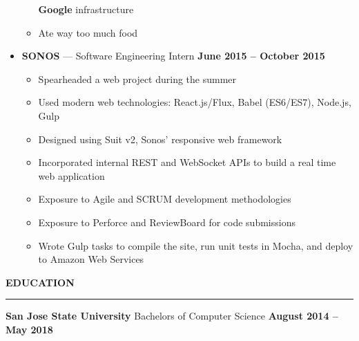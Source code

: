 \documentclass[10pt, oneside]{letter}
\newcommand{\linespaceshit} {
  \vspace{0.05in}
  \hrule
  \vspace{0.05in}
}
\begin{document}
\begin{adjustwidth}{0.1in}{0pt}
\begin{itemize}
\begin{itemize}
{                  \textbf{Google} infrastructure
              }
              \item Ate way too much food
            \end{itemize}
        \item
          \textbf{SONOS} --- Software Engineering Intern \hfill \textbf{June 2015 -- October 2015}
            \begin{itemize}
              \item Spearheaded a web project during the summer
              \item {
                  Used modern web technologies: React.js/Flux, Babel (ES6/ES7),
                  Node.js, Gulp
              }
              \item Designed using Suit v2, Sonos' responsive web framework
              \item {
                  Incorporated internal REST and WebSocket APIs to build a real
                  time web application
              }
              \item Exposure to Agile and SCRUM development methodologies
              \item Exposure to Perforce and ReviewBoard for code submissions
              \item {
                  Wrote Gulp tasks to compile the site, run unit tests in
                  Mocha, and deploy to Amazon Web Services
              }
            \end{itemize}
      \end{itemize}

    \end{adjustwidth}

  \textbf{EDUCATION}
  \linespaceshit
    \begin{adjustwidth}{0.1in}{0pt}
      \textbf{San Jose State University} \hfill Bachelors of Computer Science \hfill \textbf{August 2014 -- May 2018}
    \end{adjustwidth}
\end{document}
